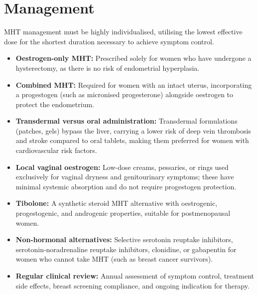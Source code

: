 \section*{Management}
MHT management must be highly individualised, utilising the lowest effective dose for the shortest duration necessary to achieve symptom control.
\begin{itemize}
    \item \textbf{Oestrogen-only MHT:} Prescribed solely for women who have undergone a hysterectomy, as there is no risk of endometrial hyperplasia.
    \item \textbf{Combined MHT:} Required for women with an intact uterus, incorporating a progestogen (such as micronised progesterone) alongside oestrogen to protect the endometrium.
    \item \textbf{Transdermal versus oral administration:} Transdermal formulations (patches, gels) bypass the liver, carrying a lower risk of deep vein thrombosis and stroke compared to oral tablets, making them preferred for women with cardiovascular risk factors.
    \item \textbf{Local vaginal oestrogen:} Low-dose creams, pessaries, or rings used exclusively for vaginal dryness and genitourinary symptoms; these have minimal systemic absorption and do not require progestogen protection.
    \item \textbf{Tibolone:} A synthetic steroid MHT alternative with oestrogenic, progestogenic, and androgenic properties, suitable for postmenopausal women.
    \item \textbf{Non-hormonal alternatives:} Selective serotonin reuptake inhibitors, serotonin-noradrenaline reuptake inhibitors, clonidine, or gabapentin for women who cannot take MHT (such as breast cancer survivors).
    \item \textbf{Regular clinical review:} Annual assessment of symptom control, treatment side effects, breast screening compliance, and ongoing indication for therapy.
\end{itemize}

